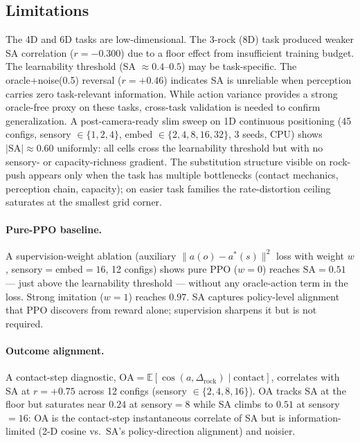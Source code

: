 \documentclass{article}
\begin{document}
\subsection{Limitations}

The 4D and 6D tasks are low-dimensional. The 3-rock (8D) task produced weaker SA
correlation ($r = -0.300$) due to a floor effect from insufficient training budget.
The learnability threshold (SA $\approx 0.4$--$0.5$) may be
task-specific. The oracle+noise(0.5) reversal ($r = +0.46$) indicates SA is
unreliable when perception carries zero task-relevant information.
While action variance provides a strong oracle-free proxy on these tasks,
cross-task validation is needed to confirm generalization. A
post-camera-ready slim sweep on 1D continuous positioning (45 configs,
sensory $\in \{1,2,4\}$, embed $\in \{2,4,8,16,32\}$, 3 seeds, CPU)
shows $|\text{SA}| \approx 0.60$ uniformly: all cells cross the
learnability threshold but with no sensory- or capacity-richness
gradient. The substitution structure visible on rock-push appears only
when the task has multiple bottlenecks (contact mechanics, perception
chain, capacity); on easier task families the rate-distortion ceiling
saturates at the smallest grid corner.

\paragraph{Pure-PPO baseline.}
A supervision-weight ablation (auxiliary $\|a(o) - a^*(s)\|^2$
loss with weight $w$, sensory$=$embed$=16$, 12 configs) shows pure PPO
($w{=}0$) reaches $\text{SA}=0.51$ — just above the learnability
threshold — without any oracle-action term in the loss. Strong
imitation ($w{=}1$) reaches $0.97$. SA captures policy-level alignment
that PPO discovers from reward alone; supervision sharpens it but is
not required.

\paragraph{Outcome alignment.}
A contact-step diagnostic, $\text{OA} = \mathbb{E}[\cos(a,
\Delta_{\text{rock}}) \mid \text{contact}]$, correlates with SA at
$r = +0.75$ across 12 configs (sensory $\in \{2,4,8,16\}$). OA tracks
SA at the floor but saturates near $0.24$ at sensory$=8$ while SA
climbs to $0.51$ at sensory$=16$: OA is the contact-step instantaneous
correlate of SA but is information-limited (2-D cosine vs.\ SA's
policy-direction alignment) and noisier.
\end{document}
